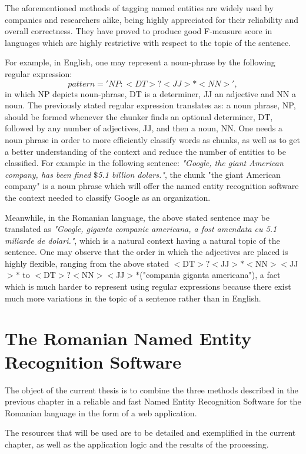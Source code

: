 \documentclass[12pt,a4paper]{article}
\begin{document}
\qquad \quad The aforementioned methods of tagging named entities are widely used by companies and researchers alike, being highly appreciated for their reliability and overall correctness. They have proved to produce good F-measure score in languages which are highly restrictive with respect to the topic of the sentence.

\qquad For example, in English, one may represent a noun-phrase by the following regular expression:
\[pattern = 'NP: {<DT>?<JJ>*<NN>}',\]
in which NP depicts noun-phrase, DT is a determiner, JJ an adjective and NN a noun. The previously stated regular expression translates as: a noun phrase, NP, should be formed whenever the chunker finds an optional determiner, DT, followed by any number of adjectives, JJ, and then a noun, NN. One needs a noun phrase in order to more efficiently classify words as chunks, as well as to get a better understanding of the context and reduce the number of entities to be classified. For example in the following sentence: \textit{"Google, the giant American company, has been fined $\$$5.1 billion dolars."}, the chunk "the giant American company" is a noun phrase which will offer the named entity recognition software the context needed to classify Google as an organization.

\qquad Meanwhile, in the Romanian language, the above stated sentence may be translated as \textit{"Google, giganta companie americana, a fost amendata cu 5.1 miliarde de dolari."}, which is a natural context having a natural topic of the sentence. One may observe that the order in which the adjectives are placed is highly flexible, ranging from the above stated $<$DT$>?<$JJ$>*<$NN$><$JJ$>*$ to $<$DT$>?<$NN$><$JJ$>*$("compania giganta americana"), a fact which is much harder to represent using regular expressions because there exist much more variations in the topic of a sentence rather than in English.
\section{The Romanian Named Entity Recognition Software}

\qquad \quad The object of the current thesis is to combine the three methods described in the previous chapter in a reliable and fast Named Entity Recognition Software for the Romanian language in the form of a web application.

\qquad The resources that will be used are to be detailed and exemplified in the current chapter, as well as the application logic and the results of the processing.
\end{document}

